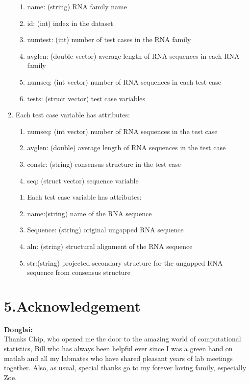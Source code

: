 \documentclass{article}
\begin{document}
\begin{spacing}{1.1}
\begin{enumerate}
\begin{enumerate}
\item name: (string) RNA family name
\item id: (int) index in the dataset
\item numtest: (int) number of test cases in the RNA family
\item avglen: (double vector) average length of RNA sequences in each RNA family
\item numseq: (int vector) number of RNA sequences in each test case
\item tests: (struct vector) test case variables
\end{enumerate}
\item Each test case variable has attributes: 
\begin{enumerate}
\item numseq: (int vector) number of RNA sequences in the test case
\item avglen: (double) average length of RNA sequences in the test case
\item constr: (string) consensus structure in the test case
\item seq: (struct vector) sequence variable
\end{enumerate}
\begin{enumerate}
\item Each test case variable has attributes: 
\item name:(string) name of the RNA sequence
\item Sequence: (string) original ungapped RNA sequence
\item aln: (string) structural alignment of the RNA sequence
\item str:(string) projected secondary structure for the ungapped RNA sequence from consensus structure
\end{enumerate}
\end{enumerate}
\section{5.Acknowledgement}
{\bf Donglai:}\\
Thanks Chip, who opened me the door to the amazing world of computational statistics, 
Bill who has always been helpful ever since I was a green hand on matlab 
and all my labmates who have shared pleasant years of lab meetings together.
Also, as usual, special thanks go to my forever loving family, especially Zoe.\\
\end{spacing}
\end{document}
